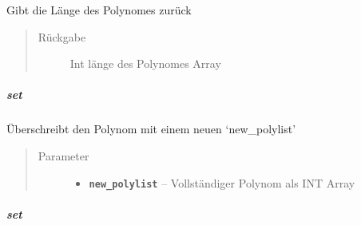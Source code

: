 \documentclass[letterpaper,10pt,ngerman]{sphinxmanual}
\begin{document}
\begin{fulllineitems}
\label{com/linuxluigi/polynomial/Polynomial:com.linuxluigi.polynomial.Polynomial.length()}
Gibt die Länge des Polynomes zurück
\begin{quote}\begin{description}
\item[{Rückgabe}] \leavevmode
Int länge des Polynomes Array

\end{description}\end{quote}

\end{fulllineitems}



\subparagraph{set}
\label{com/linuxluigi/polynomial/Polynomial:set}

\begin{fulllineitems}
\label{com/linuxluigi/polynomial/Polynomial:com.linuxluigi.polynomial.Polynomial.set(double__)}
Überschreibt den Polynom mit einem neuen `new\_polylist'
\begin{quote}\begin{description}
\item[{Parameter}] \leavevmode\begin{itemize}
\item {} 
\textbf{\texttt{new\_polylist}} -- Vollständiger Polynom als INT Array

\end{itemize}

\end{description}\end{quote}

\end{fulllineitems}



\subparagraph{set}
\label{com/linuxluigi/polynomial/Polynomial:id4}
\end{document}
